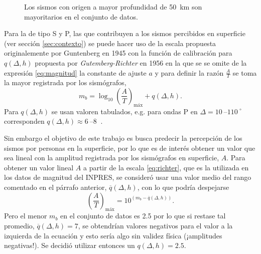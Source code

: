 \documentclass[a4paper]{report}
\begin{document}
\begin{figure}[!ht]
	\centering
	
  \vspace{-1cm} %
	\caption{Los sismos con origen a mayor profundidad de \SI{50}{\kilo\metre} son mayoritarios en el conjunto de datos.}
	\label{fig:histograma_profundidad750km}
\end{figure}





Para la de tipo S y P, las que contribuyen a los sismos percibidos en superficie (ver sección \ref{sec:contexto}) se puede hacer uso de la escala propuesta originalemente por Guntenberg en 1945 con la función de calibración para \(q(\Delta, h)\) propuesta por \emph{Gutemberg-Richter} en 1956 \cite[ecuación 4.18]{fowler_solid_1990} en la que se se omite de la expresión \ref{eq:magnitud} la constante de ajuste \(a\) y para definir la razón \(\frac{A}{T}\) se toma la mayor registrada por los sismógrafos,
\begin{equation}
	m_b = \log_{10} \left( \frac{A}{T} \right)_\text{máx} + q(\Delta, h).
	\label{eq:richter}
\end{equation}
Para \(q(\Delta, h)\) se usan valoren tabulados, e.g. para ondas P en \(\Delta = \SIrange{10}{110}{} ^\circ\) corresponden \(q(\Delta, h) \approx \SIrange{6}{8}{}\) \cite{willian_l_ellsworth_earthquake_1991}.

Sin embargo el objetivo de este trabajo es busca predecir la percepción de los sismos por personas en la superficie, por lo que es de interés obtener un valor que sea lineal con la amplitud registrada por los sismógrafos en superficie, \(A\).
Para obtener un valor lineal \(A\) a partir de la escala \ref{eq:richter}, que es la utilizada en los datos de magnitud del INPRES, se consideró usar una valor medio del rango comentado en el párrafo anterior, \(\overline{q}(\Delta,h)\), con lo que podría despejarse
\begin{equation}
	\left( \frac{A}{T} \right)_\text{máx} = 10^{(m_b - \overline{q}(\Delta,h) )}.
	\label{eq:linealizacionMagnitud}
\end{equation}
Pero el menor \(m_b\) en el conjunto de datos es \num{2.5} por lo que si restase tal promedio, \(\overline{q}(\Delta,h) = 7\), se obtendrían valores negativos para el valor a la izquierda de la ecuación y esto sería algo sin validez física (¡amplitudes negativas!).
Se decidió utilizar entonces un \(q(\Delta,h) = \num{2.5}\).  
\end{document}
